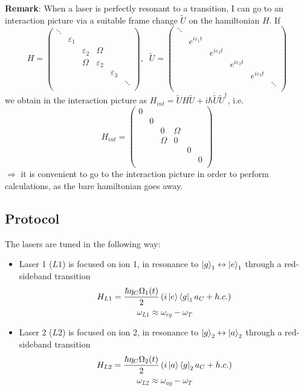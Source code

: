\textbf{Remark}: When a laser is perfectly resonant to a transition, I can go to an interaction picture via a suitable frame change $\tilde{U}$ on the hamiltonian $H$. If
\begin{equation*}
H = \begin{pmatrix}
    \ddots\\
    & \varepsilon_1\\
    &&\varepsilon_2&\Omega\\
    &&\Omega& \varepsilon_2\\
    &&&&\varepsilon_3\\
    &&&&&\ddots\\
\end{pmatrix},
\;\;
\tilde{U} = \begin{pmatrix}
    \ddots\\
    & e^{i\varepsilon_1t}\\
    && e^{i\varepsilon_2t}\\
    &&& e^{i\varepsilon_2t}\\
    &&&& e^{i\varepsilon_3t}\\
    &&&&&\ddots\\
\end{pmatrix}
\end{equation*}
we obtain in the interaction picture as $H_{int} = \tilde{U}H\tilde{U} + i\hbar \dot{\tilde{U}}\tilde{U}^\dag$, i.e.
\begin{equation*}
H_{int} = \begin{pmatrix}
    0\\
    & 0\\
    && 0 & \Omega\\
    && \Omega & 0\\
    &&&& 0\\
    &&&&&0\\
\end{pmatrix}
\end{equation*}
$\Rightarrow$ it is convenient to go to the interaction picture in order to perform calculations, as the bare hamiltonian goes away.




\subsection{Protocol}

The lasers are tuned in the following way:
\begin{itemize}
    \item Laser 1 ($L1$) is focused on ion 1, in resonance to $\ket{g}_1 \leftrightarrow \ket{e}_1$ through a red-sideband transition\\
    $$H_{L1} = \frac{\hbar\eta_C\Omega_1(t)}{2}
    \left( i\ket{e}\bra{g}_1 a_C + h.c. \right)$$
    $$\omega_{L1} \approx \omega_{eg} -\omega_T$$
    \item Laser 2 ($L2$) is focused on ion 2, in resonance to $\ket{g}_2 \leftrightarrow \ket{a}_2$ through a red-sideband transition\\
    $$H_{L2} = \frac{\hbar\eta_C\Omega_2(t)}{2}
    \left( i\ket{a}\bra{g}_2a_C + h.c. \right)$$
    $$\omega_{L2} \approx \omega_{ag} -\omega_T$$
\end{itemize}




